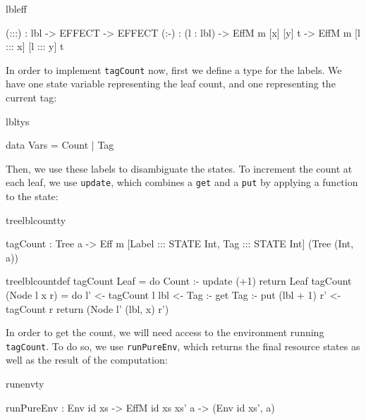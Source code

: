 \begin{SaveVerbatim}{lbleff}

(:::) : lbl -> EFFECT -> EFFECT
(:-)  : (l : lbl) -> EffM m [x] [y] t -> 
                     EffM m [l ::: x] [l ::: y] t

\end{SaveVerbatim}

\noindent
In order to implement \texttt{tagCount} now, first we define a type for the
labels. We have one state variable representing the leaf count, and one
representing the current tag:

\begin{SaveVerbatim}{lbltys}

data Vars = Count | Tag

\end{SaveVerbatim}

\noindent
Then, we use these labels to disambiguate the states. To increment the count
at each leaf, we use \texttt{update}, which combines a \texttt{get} and a
\texttt{put} by applying a function to the state:

\begin{SaveVerbatim}{treelblcountty}

tagCount : Tree a -> Eff m [Label ::: STATE Int, 
                            Tag   ::: STATE Int] 
                              (Tree (Int, a))
\end{SaveVerbatim}
\begin{SaveVerbatim}{treelblcountdef}
tagCount Leaf
     = do Count :- update (+1)
          return Leaf
tagCount (Node l x r) 
     = do l' <- tagCount l
          lbl <- Tag :- get
          Tag :- put (lbl + 1)
          r' <- tagCount r
          return (Node l' (lbl, x) r')

\end{SaveVerbatim}



\noindent
In order to get the count, we will need access to the environment 
running \texttt{tagCount}. To do so, we use \texttt{runPureEnv}, which returns
the final resource states as well as the result of the computation:

\begin{SaveVerbatim}{runenvty}

runPureEnv : Env id xs -> 
             EffM id xs xs' a -> (Env id xs', a)

\end{SaveVerbatim}

